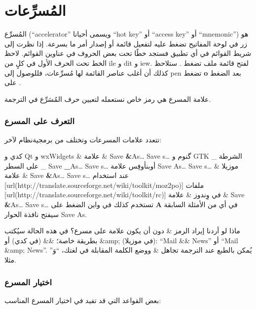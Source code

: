 \section[ref:34484726]{المُسرِّعات}
المُسرِّع (“accelerator” ويسمى
أحيانا “hot key” أو “access key” أو “mnemonic”) هو زر في لوحة المفاتيح
تضغط عليه لتفعيل قائمة أو إصدار أمر ما بسرعة. إذا نظرت إلى شريط القوائم
في أي تطبيق فستجد خطًا تحت بعض الحروف في عناوين القوائم. لاحظ الخط تحت
الحرف الأول في كلٍ من ile و dit و
iew. لفتح قائمة ملف تضغط . ستلاحظ كذلك أن أغلب عناصر
القائمة لها مُسرِّعات، فللوصول إلى pen تضغط {\bf o} بعد
الضغط على .

علامة المسرع هي رمز خاص نستعمله لتعيين حرف المُسَرِّع في الترجمة.

\subsubsection{التعرف على المسرع}
تتعدد علامات المسرعات وتختلف من برمجية نظام لآخر:

\starttable[|l|l|l|l|l|l|]
\HL
\NC {} \NC {} \NC
{} \NC {} \NC
{} \NC {}\NC\AR
\HL
\NC كدي و Qt و wxWidgets \NC \&  \NC علامة \& \NC Save {\bf \&}As…  \NC
Save s… \NC \NC\AR
\HL
\NC گنوم و GTK \NC \_  \NC الشرطة على السطر \_ \NC Save {\bf \_}As…  \NC
Save s… \NC \NC\AR
\HL
\NC أوبن​أوفِس \NC {}   \NC علامة   \NC Save {\bf
{} }As…  \NC Save s… \NC \NC\AR
\HL
\NC موزيلا \NC \&  \NC علامة \& \NC Save {\bf \&}As…  \NC Save
s… \NC عند استخدام
[url(http://translate.sourceforge.net/wiki/toolkit/moz2po)]
\NC\AR
\HL
\NC ملفات [url(http://translate.sourceforge.net/wiki/toolkit/rc)]
في وِندوز  \NC \&  \NC علامة \& \NC Save {\bf \&}As…  \NC Save
s… \NC تستخدم كذلك في واين\NC\AR
\HL
\stoptable
الضغط على {\bf A} في أي من الأمثلة السابقة سيفتح نافذة الحوار Save As.

ماذا لو أردنا إيراد الرمز \& دون أن يكون علامة على مسرع؟ في هذه الحالة
سيُكتب بطريقة خاصة؛ \&\& (في كدي) أو ‪\&amp;‬ (في موزيلا): “Mail \&\&
News” أو “Mail \&amp; News”. يُمكن بالطبع عند الترجمة تجاهل \& ووضع
الكلمة المقابلة في لغتك، “وَ” مثلا.

\subsubsection{اختيار المسرع}
بعض القواعد التي قد تفيد في اختيار المسرع المناسب:

